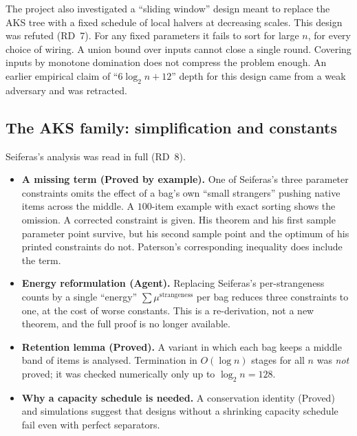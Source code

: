 The project also investigated a ``sliding window'' design meant to replace the AKS tree with a fixed schedule of local halvers at decreasing scales. This design was refuted (RD~7). For any fixed parameters it fails to sort for large $n$, for every choice of wiring. A union bound over inputs cannot close a single round. Covering inputs by monotone domination does not compress the problem enough. An earlier empirical claim of ``$6\log_2 n + 12$'' depth for this design came from a weak adversary and was retracted.

\subsection{The AKS family: simplification and constants}\label{sec:aks}

Seiferas's analysis \cite{seiferas2009sorting} was read in full (RD~8).
\begin{itemize}
    \item \textbf{A missing term (Proved by example).} One of Seiferas's three parameter constraints omits the effect of a bag's own ``small strangers'' pushing native items across the middle. A $100$-item example with exact sorting shows the omission. A corrected constraint is given. His theorem and his first sample parameter point survive, but his second sample point and the optimum of his printed constraints do not. Paterson's corresponding inequality \cite{paterson1990improved} does include the term.
    \item \textbf{Energy reformulation (Agent).} Replacing Seiferas's per-strangeness counts by a single ``energy'' $\sum \mu^{\text{strangeness}}$ per bag reduces three constraints to one, at the cost of worse constants. This is a re-derivation, not a new theorem, and the full proof is no longer available.
    \item \textbf{Retention lemma (Proved).} A variant in which each bag keeps a middle band of items is analysed. Termination in $O(\log n)$ stages for all $n$ was \emph{not} proved; it was checked numerically only up to $\log_2 n = 128$.
    \item \textbf{Why a capacity schedule is needed.} A conservation identity (Proved) and simulations suggest that designs without a shrinking capacity schedule fail even with perfect separators.
\end{itemize}

